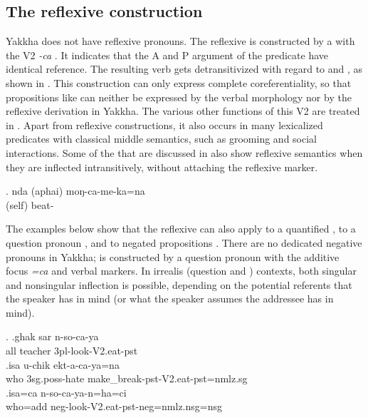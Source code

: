 \subsection{The reflexive construction}\label{refl}

Yakkha does not have reflexive pronouns. The reflexive is constructed by a  with the V2 \emph{-ca} . It indicates that the A and P argument of the predicate have identical reference.  The resulting verb gets detransitivized with regard to  and , as shown in \Next. This construction can only express complete coreferentiality, so that propositions like  can neither be expressed by the verbal morphology nor by the reflexive derivation  in Yakkha.
The various other functions of this V2 are treated in . Apart from reflexive constructions, it also occurs in many lexicalized predicates with classical middle semantics, such as grooming and social interactions. Some of the  that are discussed in  also show reflexive semantics when they are inflected intransitively, without attaching the reflexive marker. 

\exg. nda (aphai) moŋ-ca-me-ka=na\\
 (self) beat-\\


The examples below show that the reflexive can also apply to a quantified  \Next[a], to a question pronoun \Next[b], and to negated propositions \Next[c]. There are no dedicated negative pronouns in Yakkha;  is constructed by a question pronoun with the additive focus  \emph{=ca} and verbal  markers. In irrealis (question and ) contexts, both singular and nonsingular inflection is possible, depending on the potential referents that the speaker has in mind (or what the speaker assumes the addressee has in mind).

\ex. \ag.ghak sar n-so-ca-ya\\
		all teacher {\sc 3pl}-look-{\sc V2.eat-pst}\\
 	\bg.\label{uchik}isa u-chik ekt-a-ca-ya=na \\
	who {\sc 3sg.poss}-hate make\_break{\sc [3sg]-pst-V2.eat-pst=nmlz.sg} 	\\
	 \bg.isa=ca n-so-ca-ya-n=ha=ci \\
	who{\sc =add}  {\sc neg}-look-{\sc V2.eat-pst-neg=nmlz.nsg=nsg}	\\


